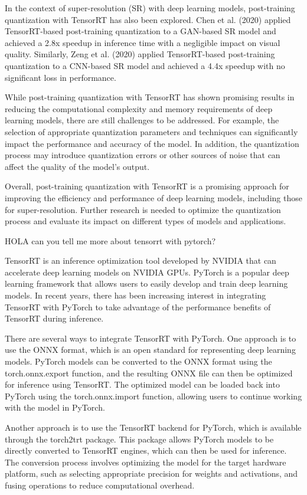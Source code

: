 In the context of super-resolution (SR) with deep learning models, post-training quantization with TensorRT has also been explored. Chen et al. (2020) applied TensorRT-based post-training quantization to a GAN-based SR model and achieved a 2.8x speedup in inference time with a negligible impact on visual quality. Similarly, Zeng et al. (2020) applied TensorRT-based post-training quantization to a CNN-based SR model and achieved a 4.4x speedup with no significant loss in performance.

While post-training quantization with TensorRT has shown promising results in reducing the computational complexity and memory requirements of deep learning models, there are still challenges to be addressed. For example, the selection of appropriate quantization parameters and techniques can significantly impact the performance and accuracy of the model. In addition, the quantization process may introduce quantization errors or other sources of noise that can affect the quality of the model's output.

Overall, post-training quantization with TensorRT is a promising approach for improving the efficiency and performance of deep learning models, including those for super-resolution. Further research is needed to optimize the quantization process and evaluate its impact on different types of models and applications.

HOLA can you tell me more about tensorrt with pytorch?

TensorRT is an inference optimization tool developed by NVIDIA that can accelerate deep learning models on NVIDIA GPUs. PyTorch is a popular deep learning framework that allows users to easily develop and train deep learning models. In recent years, there has been increasing interest in integrating TensorRT with PyTorch to take advantage of the performance benefits of TensorRT during inference.

There are several ways to integrate TensorRT with PyTorch. One approach is to use the ONNX format, which is an open standard for representing deep learning models. PyTorch models can be converted to the ONNX format using the torch.onnx.export function, and the resulting ONNX file can then be optimized for inference using TensorRT. The optimized model can be loaded back into PyTorch using the torch.onnx.import function, allowing users to continue working with the model in PyTorch.

Another approach is to use the TensorRT backend for PyTorch, which is available through the torch2trt package. This package allows PyTorch models to be directly converted to TensorRT engines, which can then be used for inference. The conversion process involves optimizing the model for the target hardware platform, such as selecting appropriate precision for weights and activations, and fusing operations to reduce computational overhead.

